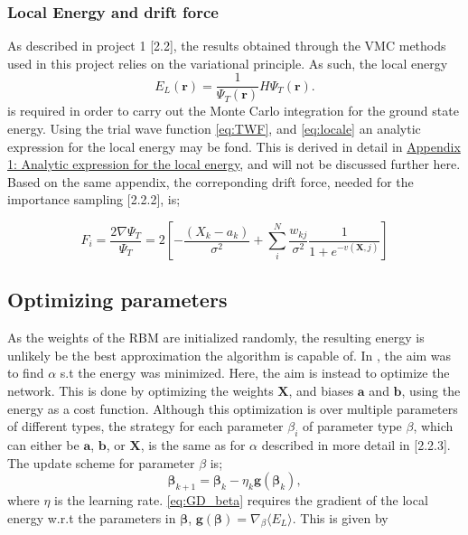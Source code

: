 \documentclass[%
oneside,                 %
final,                   %
10pt]{article}
\begin{document}
\subsubsection{Local Energy and drift force}
As described in project 1 \cite{JN_P1}[2.2], the results obtained through the VMC methods used in this project relies on the variational principle. As such, the local energy
\begin{equation}
    E_L(\mathbf{r})=\frac{1}{\Psi_T(\mathbf{r})}H\Psi_T(\mathbf{r}).
    \label{eq:locale}
 \end{equation}
is required in order to carry out the Monte Carlo integration for the ground state energy. Using the trial wave function \eqref{eq:TWF}, and \eqref{eq:locale} an analytic expression for the local energy may be fond. This is derived in detail in \hyperref[APP_1]{Appendix 1: Analytic expression for the local energy}, and will not be discussed further here. Based on the same appendix, the correponding drift force, needed for the importance sampling \cite{JN_P1}[2.2.2], is;

\begin{equation}
F_i = \frac{2\nabla \Psi_T}{\Psi_T} = 2 \left[- \frac{(X_k - a_k)}{\sigma^2} + \sum_{i}^N \frac{w_{kj}}{\sigma^2}\frac{1}{1 + e^{-v(\bm X,j)}} \right]
\end{equation} 

\subsection{Optimizing parameters}
As the weights of the RBM are initialized randomly, the resulting energy is unlikely be the best approximation the algorithm is capable of. In \cite{JN_P1}, the aim was to find $\alpha$ s.t the energy was minimized. Here, the aim is instead to optimize the network.  This is done by optimizing the weights $\bm X$, and biases $\bm a$ and $\bm b$, using the energy as a cost function. Although this optimization is over multiple parameters of different types, the strategy for each parameter $\beta_i$ of parameter type $\beta$, which can either be $\bm a$, $\bm b$, or $\bm X$, is the same as for $\alpha$ described in more detail in \cite{JN_P1}[2.2.3]. The update scheme for parameter $\beta$ is;
\begin{equation}
\bm{\beta}_{k+1}=\bm{\beta}_{k}-\eta_k  \bm g (\bm{\beta}_k),
\label{eq:GD_beta}
\end{equation}
where $\eta$ is the learning rate. \eqref{eq:GD_beta} requires the gradient of the local energy w.r.t the parameters in $\bm \beta$, $\bm g (\bm \beta)=\nabla_{\beta} \langle E_L \rangle$. This is given by
\end{document}
